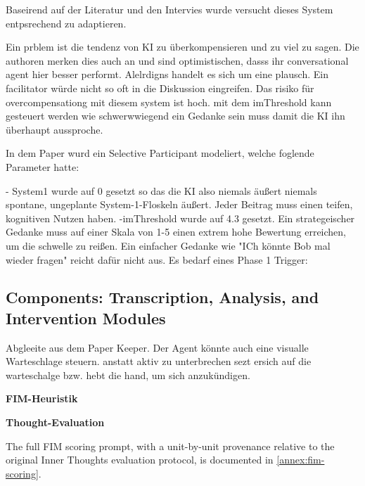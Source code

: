 Baseirend auf der Literatur und den Intervies wurde versucht dieses System entpsrechend zu adaptieren.

Ein prblem ist die tendenz von KI zu überkompensieren und zu viel zu sagen. Die authoren merken dies auch an
und sind optimistischen, dasss ihr conversational agent hier besser performt. Alelrdigns handelt es sich um
eine plausch. Ein facilitator würde nicht so oft in die Diskussion eingreifen. Das risiko für
overcompensationg mit diesem system ist hoch. mit dem imThreshold kann gesteuert werden wie schwerwwiegend
ein Gedanke sein muss damit die KI ihn überhaupt aussproche.

In dem Paper wurd ein Selective Participant modeliert, welche foglende Parameter hatte:

- System1 wurde auf 0 gesetzt so das die KI also niemals äußert niemals spontane, ungeplante
System-1-Floskeln äußert. Jeder Beitrag muss einen teifen, kognitiven Nutzen haben.
-imThreshold wurde auf 4.3 gesetzt. Ein strategeischer Gedanke muss auf einer Skala von 1-5 einen extrem
hohe Bewertung erreichen, um die schwelle zu reißen. Ein einfacher Gedanke wie "ICh könnte Bob mal wieder
fragen" reicht dafür nicht aus. Es bedarf eines
Phase 1 Trigger:

\subsection{Components: Transcription, Analysis, and Intervention Modules}

Abgleeite aus dem Paper Keeper. Der Agent könnte auch eine visualle Warteschlage steuern. anstatt aktiv zu
unterbrechen sezt ersich auf die warteschalge bzw. hebt die hand, um sich anzukündigen.

\textbf{FIM-Heuristik}

\textbf{Thought-Evaluation}

The full FIM scoring prompt, with a unit-by-unit provenance relative to the
original Inner Thoughts evaluation protocol, is documented in
\autoref{annex:fim-scoring}.


